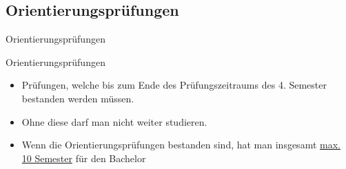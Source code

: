 \documentclass[
	aspectratio=169, 
	10pt 
]{beamer}
\begin{document}
\subsection{Orientierungsprüfungen}
\begin{frame}{Orientierungsprüfungen}
    \begin{definition}{Orientierungsprüfungen}
        \begin{itemize}
            \item Prüfungen, welche bis zum Ende des Prüfungszeitraums des 4. Semester bestanden werden müssen. 
            \item Ohne diese darf man nicht weiter studieren.
            \item Wenn die Orientierungsprüfungen bestanden sind, hat man insgesamt \underline{max. 10 Semester} für den Bachelor 
        \end{itemize}
    \end{definition}
\end{frame}
\end{document}
